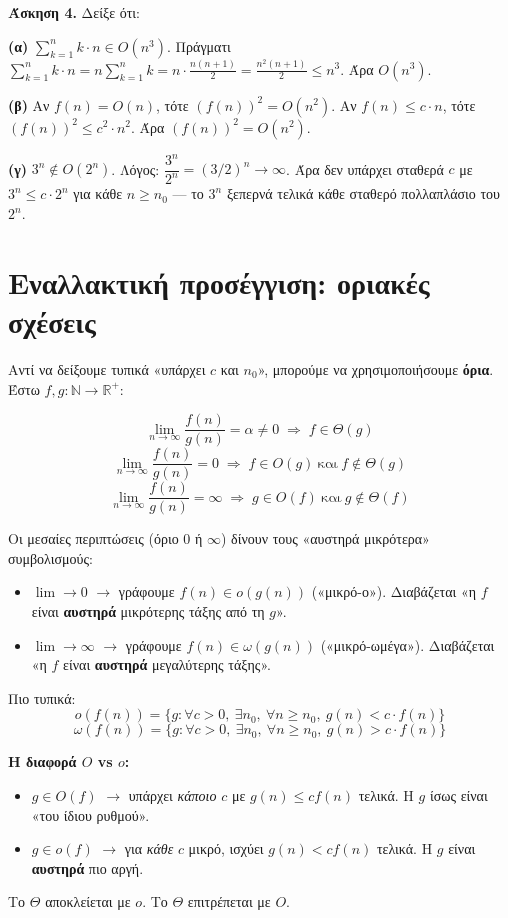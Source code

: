 \documentclass[11pt,a4paper]{article}
\begin{document}
\begin{examplebox}
\textbf{Άσκηση 4.} Δείξε ότι:

\textbf{(α)} $\sum_{k=1}^n k \cdot n \in O(n^3)$. Πράγματι
$\sum_{k=1}^n k \cdot n = n \sum_{k=1}^n k = n \cdot \frac{n(n+1)}{2} =
\frac{n^2(n+1)}{2} \le n^3$. Άρα $O(n^3)$.

\textbf{(β)} Αν $f(n) = O(n)$, τότε $(f(n))^2 = O(n^2)$. Αν $f(n) \le c \cdot n$,
τότε $(f(n))^2 \le c^2 \cdot n^2$. Άρα $(f(n))^2 = O(n^2)$.

\textbf{(γ)} $3^n \notin O(2^n)$. Λόγος: $\dfrac{3^n}{2^n} = (3/2)^n \to \infty$.
Άρα δεν υπάρχει σταθερά $c$ με $3^n \le c \cdot 2^n$ για κάθε $n \ge n_0$ --- το
$3^n$ ξεπερνά τελικά κάθε σταθερό πολλαπλάσιο του $2^n$.
\end{examplebox}

\section{Εναλλακτική προσέγγιση: οριακές σχέσεις}

Αντί να δείξουμε τυπικά «υπάρχει $c$ και $n_0$», μπορούμε να χρησιμοποιήσουμε
\textbf{όρια}. Έστω $f, g : \mathbb{N} \to \mathbb{R}^+$:

\[
\lim_{n \to \infty} \frac{f(n)}{g(n)} = \alpha \ne 0 \;\Rightarrow\; f \in \Theta(g)
\]
\[
\lim_{n \to \infty} \frac{f(n)}{g(n)} = 0 \;\Rightarrow\; f \in O(g)\ \text{και}\
f \notin \Theta(g)
\]
\[
\lim_{n \to \infty} \frac{f(n)}{g(n)} = \infty \;\Rightarrow\; g \in O(f)\
\text{και}\ g \notin \Theta(f)
\]

Οι μεσαίες περιπτώσεις (όριο $0$ ή $\infty$) δίνουν τους «αυστηρά μικρότερα»
συμβολισμούς:
\begin{itemize}
  \item $\lim \to 0$ $\to$ γράφουμε $f(n) \in o(g(n))$ («μικρό-ο»). Διαβάζεται «η
  $f$ είναι \textbf{αυστηρά} μικρότερης τάξης από τη $g$».
  \item $\lim \to \infty$ $\to$ γράφουμε $f(n) \in \omega(g(n))$
  («μικρό-ωμέγα»). Διαβάζεται «η $f$ είναι \textbf{αυστηρά} μεγαλύτερης τάξης».
\end{itemize}

Πιο τυπικά:
\[
o(f(n)) = \{g : \forall c > 0,\ \exists n_0,\ \forall n \ge n_0,\ g(n) < c \cdot
f(n)\}
\]
\[
\omega(f(n)) = \{g : \forall c > 0,\ \exists n_0,\ \forall n \ge n_0,\ g(n) > c
\cdot f(n)\}
\]

\begin{keypoint}
\textbf{Η διαφορά $O$ vs $o$:}
\begin{itemize}
  \item $g \in O(f)$ $\to$ υπάρχει \textit{κάποιο} $c$ με $g(n) \le c f(n)$
  τελικά. Η $g$ ίσως είναι «του ίδιου ρυθμού».
  \item $g \in o(f)$ $\to$ για \textit{κάθε} $c$ μικρό, ισχύει $g(n) < c f(n)$
  τελικά. Η $g$ είναι \textbf{αυστηρά} πιο αργή.
\end{itemize}
Το $\Theta$ αποκλείεται με $o$. Το $\Theta$ επιτρέπεται με $O$.
\end{keypoint}
\end{document}
